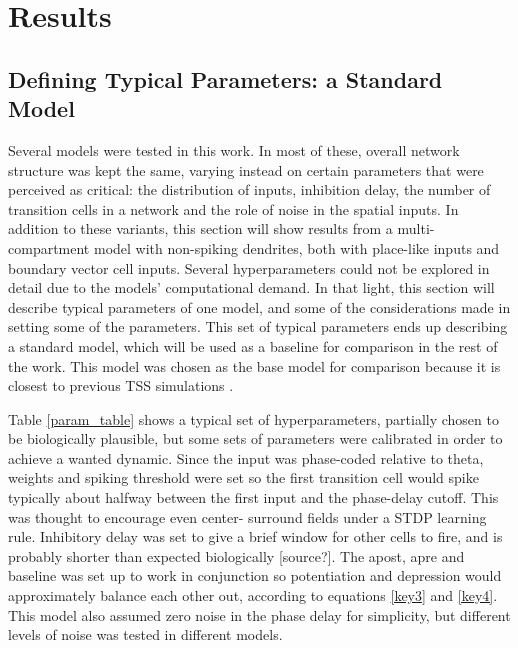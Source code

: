 \documentclass{article}
\begin{document}
    \section{Results} \label{Results}

    \subsection{Defining Typical Parameters: a Standard Model} \label{Standard model}
    Several models were tested in this work. In most of these, overall network structure was kept the same, varying instead on certain parameters that were perceived as critical: the distribution of inputs, inhibition delay, the number of transition cells in a network and the role of noise in the spatial inputs. In addition to these variants, this section will show results from a multi-compartment model with non-spiking dendrites, both with place-like inputs and boundary vector cell inputs. Several hyperparameters could not be explored in detail due to the models' computational demand. In that light, this section will describe typical parameters of one model, and some of the considerations made in setting some of the parameters. This set of typical parameters ends up describing a standard model, which will be used as a baseline for comparison in the rest of the work. This model was chosen as the base model for comparison because it is closest to previous TSS simulations \parencite{Waniek2017}.

    Table \ref{param_table} shows a typical set of hyperparameters, partially chosen to be biologically plausible, but some sets of parameters were calibrated in order to achieve a wanted dynamic. Since the input was phase-coded relative to theta, weights and spiking threshold were set so the first transition cell would spike typically about halfway between the first input and the phase-delay cutoff. This was thought to encourage even center- surround fields under a STDP learning rule. Inhibitory delay was set to give a brief window for other cells to fire, and is probably shorter than expected biologically [source?]. The apost, apre and baseline was set up to work in conjunction so potentiation and depression would approximately balance each other out, according to equations \ref{key3} and \ref{key4}. This model also assumed zero noise in the phase delay for simplicity, but different levels of noise was tested in different models.
\end{document}
